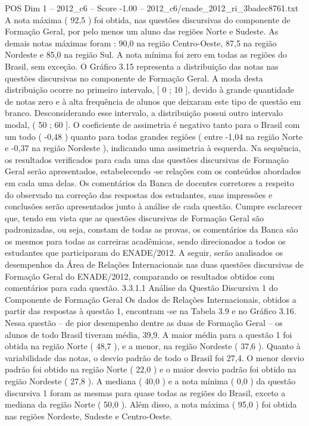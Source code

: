 \begin{textsample}{POS Dim 1 – 2012\_c6 – Score -1.00 – 2012\_c6/enade\_2012\_ri\_3badec8761.txt}
A nota máxima ( 92,5 ) foi obtida, nas questões discursivas do componente de Formação Geral, por pelo menos um aluno das regiões Norte e Sudeste.
As demais notas máximas foram : 90,0 na região Centro-Oeste, 87,5 na região Nordeste e 85,0 na região Sul.
A nota mínima foi zero em todas as regiões do Brasil, sem exceção.
O Gráfico 3.15 representa a distribuição das notas nas questões discursivas no componente de Formação Geral.
A moda desta distribuição ocorre no primeiro intervalo, [ 0 ; 10 ], devido à grande quantidade de notas zero e à alta frequência de alunos que deixaram este tipo de questão em branco.
Desconsiderando esse intervalo, a distribuição possui outro intervalo modal, ( 50 ; 60 ].
O coeficiente de assimetria é negativo tanto para o Brasil com um todo ( -0,48 ) quanto para todas grandes regiões ( entre -1,04 na região Norte e -0,37 na região Nordeste ), indicando uma assimetria à esquerda.
Na sequência, os resultados verificados para cada uma das questões discursivas de Formação Geral serão apresentados, estabelecendo -se relações com os conteúdos abordados em cada uma delas.
Os comentários da Banca de docentes corretores a respeito do observado na correção das respostas dos estudantes, suas impressões e conclusões serão apresentados junto à análise de cada questão.
Cumpre esclarecer que, tendo em vista que as questões discursivas de Formação Geral são padronizadas, ou seja, constam de todas as provas, os comentários da Banca são os mesmos para todas as carreiras acadêmicas, sendo direcionados a todos os estudantes que participaram do ENADE/2012.
A seguir, serão analisados os desempenhos da Área de Relações Internacionais nas duas questões discursivas de Formação Geral do ENADE/2012, comparando os resultados obtidos com comentários para cada questão. 3.3.1.1 Análise da Questão Discursiva 1 do Componente de Formação Geral Os dados de Relações Internacionais, obtidos a partir das respostas à questão 1, encontram -se na Tabela 3.9 e no Gráfico 3.16.
Nessa questão – de pior desempenho dentre as duas de Formação Geral – os alunos de todo Brasil tiveram média, 39,9.
A maior média para a questão 1 foi obtida na região Norte ( 48,7 ), e a menor, na região Nordeste ( 37,6 ).
Quanto à variabilidade das notas, o desvio padrão de todo o Brasil foi 27,4.
O menor desvio padrão foi obtido na região Norte ( 22,0 ) e o maior desvio padrão foi obtido na região Nordeste ( 27,8 ).
A mediana ( 40,0 ) e a nota mínima ( 0,0 ) da questão discursiva 1 foram as mesmas para quase todas as regiões do Brasil, exceto a mediana da região Norte ( 50,0 ).
Além disso, a nota máxima ( 95,0 ) foi obtida nas regiões Nordeste, Sudeste e Centro-Oeste.

\end{textsample}
